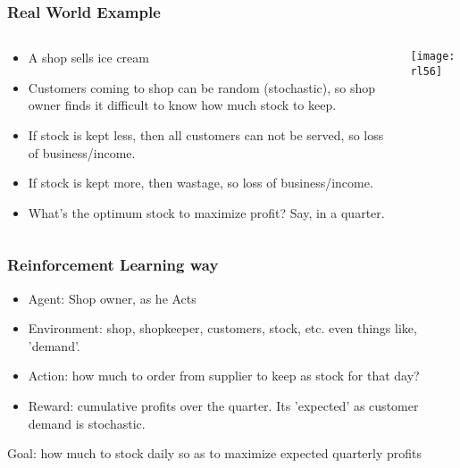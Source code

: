 \begin{frame}[fragile]\frametitle{Real World Example}

\begin{columns}
\begin{column}{0.5\textwidth}

\begin{itemize}
\item A shop sells ice cream
\item Customers coming to shop can be random (stochastic), so shop owner finds it difficult to know how much stock to keep.
\item If stock is kept less, then all customers can not be served, so loss of business/income.
\item If stock is kept more, then wastage, so loss of business/income.
\item What's the optimum stock to maximize profit? Say, in a quarter.
\end{itemize}

\end{column}
\begin{column}{0.5\textwidth}  %


\begin{center}
\texttt{[image: rl56]}
\end{center}
\end{column}
\end{columns}

\end{frame}


\begin{frame}[fragile]\frametitle{Reinforcement Learning way}

\begin{itemize}
\item Agent: Shop owner, as he Acts
\item Environment: shop, shopkeeper, customers, stock, etc. even things like, 'demand'.
\item Action: how much to order from supplier to keep as stock for that day?
\item Reward: cumulative profits over the quarter. Its 'expected' as customer demand is stochastic.
\end{itemize}
Goal: how much to stock daily so as to maximize expected quarterly profits
\end{frame}


